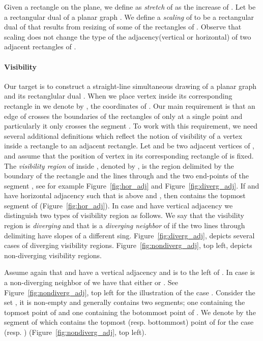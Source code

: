 \documentclass{llncs}
\begin{document}
Given a rectangle  on the plane, we define as \emph{stretch} of  as the increase of .  Let  be a rectangular dual of a planar graph . We define a \emph{scaling} of  to be a rectangular dual of  that results from resizing of some of the rectangles of . Observe that scaling does not change the type of the adjacency(vertical or horizontal) of two adjacent rectangles of . 

\paragraph{\bf Visibility} Our target is to construct a straight-line simultaneous drawing of a planar graph  and its rectanglular dual .  When we place vertex  inside its corresponding rectangle in  we denote by ,  the coordinates of .  Our main requirement is that an edge  of  crosses the boundaries of the rectangles of  only at a single point and particularly it only crosses the segment .   To work with this requirement, we need several additional definitions which reflect the notion of visibility of a vertex inside a rectangle to an adjacent rectangle.  Let  and  be two adjacent vertices of , and assume that the position of vertex  in its corresponding rectangle of  is fixed. The \emph{visibility region} of  inside , denoted by , is the region delimited by the boundary of the rectangle  and the lines through  and the two end-points of the segment , see for example Figure~\ref{fig:hor_adj} and Figure~\ref{fig:diverg_adj}.  If  and  have horizontal adjacency such that  is above  and ,  then  contains the topmost segment of  (Figure~\ref{fig:hor_adj}). In case  and  have vertical adjacency we distinguish two types of visibility region as follows. We say that the visibility region  is \emph{diverging} and that  is a \emph{diverging neighbor} of   if the two lines through  delimiting  have slopes of a different sing. Figure~\ref{fig:diverg_adj}, depicts several cases of diverging visibility regions. Figure~\ref{fig:nondiverg_adj}, top left, depicts non-diverging visibility regions.   

Assume again that  and   have a vertical adjacency and  is to the left of . In case  is a non-diverging neighbor of  we have that either   or  . See Figure~\ref{fig:nondiverg_adj}, top left for the illustration of the case . Consider the set  , it is  non-empty and generally contains two segments; one containing the topmost point of  and one containing the botommost point of . We denote by   the segment of  which contains the topmost (resp. bottommost) point of  for the case  (resp. ) (Figure~\ref{fig:nondiverg_adj}, top left). 
\end{document}
